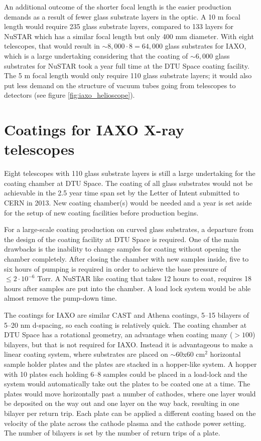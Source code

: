 An additional outcome of the shorter focal length is the easier production demands as a result of fewer glass substrate layers in the optic. A 10 m focal length would require 235 glass substrate layers, compared to 133 layers for NuSTAR which has a similar focal length but only 400 mm diameter. With eight telescopes, that would result in $\sim8,000\cdot8=64,000$ glass substrates for IAXO, which is a large undertaking considering that the coating of $\sim6,000$ glass substrates for NuSTAR took a year full time at the DTU Space coating facility. The 5 m focal length would only require 110 glass substrate layers; it would also put less demand on the structure of vacuum tubes going from telescopes to detectors (see figure \ref{fig:iaxo_helioscope}).

\section{Coatings for IAXO X-ray telescopes}
Eight telescopes with 110 glass substrate layers is still a large undertaking for the coating chamber at DTU Space. The coating of all glass substrates would not be achievable in the 2.5 year time span set by the Letter of Intent\cite{Irastorza:2013uu} submitted to CERN in 2013. New coating chamber(s) would be needed and a year is set aside for the setup of new coating facilities before production begins.

For a large-scale coating production on curved glass substrates, a departure from the design of the coating facility at DTU Space is required. One of the main drawbacks is the inability to change samples for coating without opening the chamber completely. After closing the chamber with new samples inside, five to six hours of pumping is required in order to achieve the base pressure of $\leq 2\cdot10^{-6}$ Torr. A NuSTAR like coating that takes 12 hours to coat, requires 18 hours after samples are put into the chamber. A load lock system would be able almost remove the pump-down time.

The coatings for IAXO are similar CAST and Athena coatings, 5--15 bilayers of 5--20 nm d-spacing, so each coating is relatively quick. The coating chamber at DTU Space has a rotational geometry, an advantage when coating many ($>100$) bilayers, but that is not required for IAXO. Instead it is advantageous to make a linear coating system, where substrates are placed on $\sim$60x60 cm$^2$ horizontal sample holder plates and the plates are stacked in a hopper-like system. A hopper with 10 plates each holding 6--8 samples could be placed in a load-lock and the system would automatically take out the plates to be coated one at a time. The plates would move horizontally past a number of cathodes, where one layer would be deposited on the way out and one layer on the way back, resulting in one bilayer per return trip. Each plate can be applied a different coating based on the velocity of the plate across the cathode plasma and the cathode power setting. The number of bilayers is set by the number of return trips of a plate.

